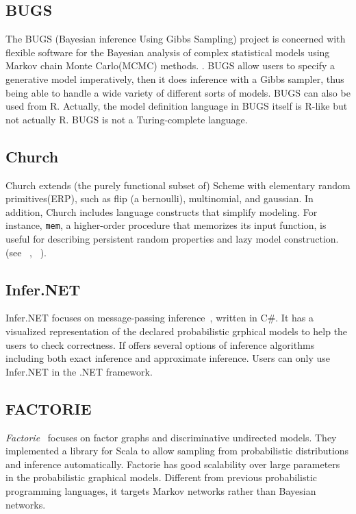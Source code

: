 \subsection{BUGS}
The BUGS (Bayesian inference Using Gibbs Sampling) project is concerned with flexible software for the Bayesian analysis of complex statistical models using Markov chain Monte Carlo(MCMC) methods. \cite{bugs}. BUGS allow users to specify a generative model imperatively, then it does inference with a Gibbs sampler, thus being able to handle a wide variety of different sorts of models. BUGS can also be used from R. Actually, the model definition language in BUGS itself is R-like but not actually R. BUGS is not a Turing-complete language.

\subsection{Church}
Church extends (the purely functional subset of) Scheme with elementary random primitives(ERP), such as flip (a bernoulli), multinomial, and gaussian. In addition, Church includes language constructs that simplify modeling. For instance, \texttt{mem}, a higher-order procedure that memorizes its input function, is useful for describing persistent random properties and lazy model construction. (see ~\cite{goodman}, ~\cite{church}).

\subsection{Infer.NET}
Infer.NET focuses on message-passing inference~\cite{bishop}, written in C\#. It has a visualized representation of the declared probabilistic grphical models to help the users to check correctness. If offers several options of inference algorithms including both exact inference and approximate inference. Users can only use Infer.NET in the .NET framework.

\subsection{FACTORIE}
\textit{Factorie}~\cite{factorie} focuses on factor graphs and discriminative undirected models. They implemented a library for Scala to allow sampling from probabilistic distributions and inference automatically. Factorie has good scalability over large parameters in the probabilistic graphical models. Different from previous probabilistic programming languages, it targets Markov networks rather than Bayesian networks.

